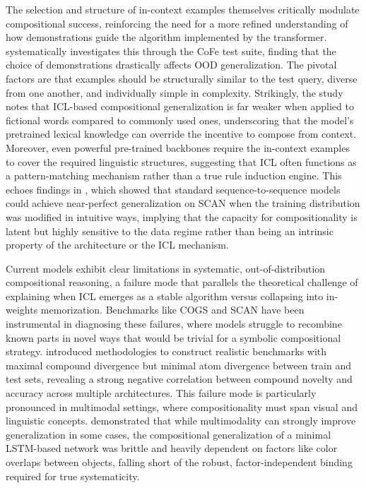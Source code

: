 \documentclass[11pt]{article}
\begin{document}
The selection and structure of in-context examples themselves critically modulate compositional success, reinforcing the need for a more refined understanding of how demonstrations guide the algorithm implemented by the transformer. \cite{ref605} systematically investigates this through the CoFe test suite, finding that the choice of demonstrations drastically affects OOD generalization. The pivotal factors are that examples should be structurally similar to the test query, diverse from one another, and individually simple in complexity. Strikingly, the study notes that ICL-based compositional generalization is far weaker when applied to fictional words compared to commonly used ones, underscoring that the model's pretrained lexical knowledge can override the incentive to compose from context. Moreover, even powerful pre-trained backbones require the in-context examples to cover the required linguistic structures, suggesting that ICL often functions as a pattern-matching mechanism rather than a true rule induction engine. This echoes findings in \cite{ref606}, which showed that standard sequence-to-sequence models could achieve near-perfect generalization on SCAN when the training distribution was modified in intuitive ways, implying that the capacity for compositionality is latent but highly sensitive to the data regime rather than being an intrinsic property of the architecture or the ICL mechanism.

Current models exhibit clear limitations in systematic, out-of-distribution compositional reasoning, a failure mode that parallels the theoretical challenge of explaining when ICL emerges as a stable algorithm versus collapsing into in-weights memorization. Benchmarks like COGS and SCAN have been instrumental in diagnosing these failures, where models struggle to recombine known parts in novel ways that would be trivial for a symbolic compositional strategy. \cite{ref607} introduced methodologies to construct realistic benchmarks with maximal compound divergence but minimal atom divergence between train and test sets, revealing a strong negative correlation between compound novelty and accuracy across multiple architectures. This failure mode is particularly pronounced in multimodal settings, where compositionality must span visual and linguistic concepts. \cite{ref608} demonstrated that while multimodality can strongly improve generalization in some cases, the compositional generalization of a minimal LSTM-based network was brittle and heavily dependent on factors like color overlaps between objects, falling short of the robust, factor-independent binding required for true systematicity.
\end{document}
